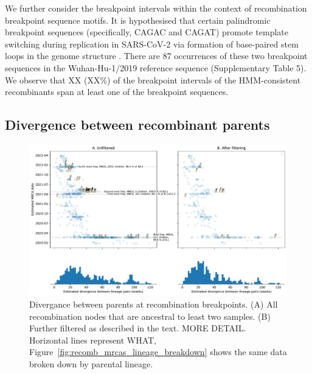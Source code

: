 \documentclass{article}
\begin{document}
We further consider the breakpoint intervals within the context of
recombination breakpoint sequence motifs. It is hypothesised that certain
palindromic breakpoint sequences (specifically, CAGAC and CAGAT) promote
template switching during replication in SARS-CoV-2 via formation of
base-paired stem loops in the genome structure \citep{Gallaher2020-lb}. There
are 87 occurrences of these two breakpoint sequences in the Wuhan-Hu-1/2019
reference sequence (Supplementary Table 5). We observe that XX (XX\%) of the
breakpoint intervals of the HMM-consistent recombinants span at least one of
the breakpoint sequences.

\subsection{Divergence between recombinant parents}

\begin{figure} \centering
\includegraphics[width=\textwidth]{figures/recombination_node_mrcas.pdf}
\caption{\label{fig:recomb_mrcas} Divergance between parents at
recombination breakpoints. (A) All recombination nodes that are ancestral
to least two samples. (B) Further filtered as described in the text.
MORE DETAIL. Horizontal lines represent WHAT,
Figure~\ref{fig:recomb_mrcas_lineage_breakdown} shows the same data
broken down by parental lineage.}
\end{figure}
\end{document}
